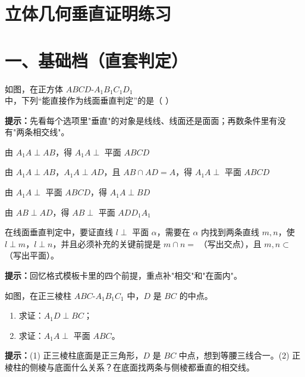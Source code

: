 \documentclass{exam-zh}
\begin{document}
\section*{立体几何垂直证明练习}

\section*{一、基础档（直套判定）}


\begin{question}[points=5]
  如图，在正方体 $ABCD\text{-}A_1B_1C_1D_1$ 中，下列“能直接作为线面垂直判定”的是（    ）
  \begin{hintbox}
\textbf{提示：}先看每个选项里"垂直"的对象是线线、线面还是面面；再数条件里有没有"两条相交线"。\end{hintbox}

  \begin{choices}
    \item 由 $A_1A\perp AB$，得 $A_1A\perp$ 平面 $ABCD$
    \item 由 $A_1A\perp AB$，$A_1A\perp AD$，且 $AB\cap AD=A$，得 $A_1A\perp$ 平面 $ABCD$
    \item 由 $A_1A\perp$ 平面 $ABCD$，得 $A_1A\perp BD$
    \item 由 $AB\perp AD$，得 $AB\perp$ 平面 $ADD_1A_1$
  \end{choices}
\end{question}



\begin{question}[points=5]
  在线面垂直判定中，要证直线 $l\perp$ 平面 $\alpha$，需要在 $\alpha$ 内找到两条直线 $m,n$，使 $l\perp m$，$l\perp n$，并且必须补充的关键前提是 $m\cap n=$ \underline{\quad\quad\quad}（写出交点），且 $m,n\subset$ \underline{\quad\quad\quad}（写出平面）。
  \begin{hintbox}
\textbf{提示：}回忆格式模板卡里的四个前提，重点补"相交"和"在面内"。\end{hintbox}

\end{question}



\begin{problem}[points=8]
    如图，在正三棱柱 $ABC\text{-}A_1B_1C_1$ 中，$D$ 是 $BC$ 的中点。
\begin{enumerate}[label=(\arabic*)]
  \item 求证：$A_1D\perp BC$；
  \item 求证：$A_1A\perp$ 平面 $ABC$。
\end{enumerate}

    \begin{hintbox}
\textbf{提示：}(1) 正三棱柱底面是正三角形，$D$ 是 $BC$ 中点，想到等腰三线合一。(2) 正棱柱的侧棱与底面什么关系？在底面找两条与侧棱都垂直的相交线。\end{hintbox}

  \answerarea[48mm]
\end{problem}
\end{document}
